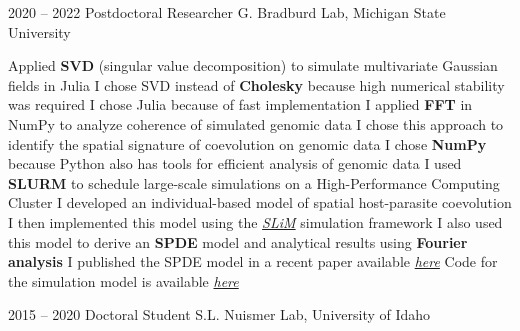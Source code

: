 \documentclass[9pt]{developercv} %
\begin{document}
\begin{entrylist}
{\begin{outline}[itemize]
                \end{outline}}
               \entry
               {2020 -- 2022}
               {Postdoctoral Researcher}
               {G. Bradburd Lab, Michigan State University}
               {\vspace{-10 pt}\begin{outline}[itemize]
                    \1 Applied \textbf{SVD} (singular value decomposition) to simulate multivariate Gaussian fields in Julia
                        \vspace{-6 pt}\2[$\cdot$] I chose SVD instead of \textbf{Cholesky} because high numerical stability was required
                        \vspace{-3 pt}\2[$\cdot$] I chose Julia because of fast implementation
                    \vspace{-6 pt}\1 I applied \textbf{FFT} in NumPy to analyze coherence of simulated genomic data
                        \vspace{-6 pt} \2[$\cdot$] I chose this approach to identify the spatial signature of coevolution on genomic data
                        \vspace{-3 pt} \2[$\cdot$] I chose \textbf{NumPy} because Python also has tools for efficient analysis of genomic data
                    \vspace{-6 pt} \1 I used \textbf{SLURM} to schedule large-scale simulations on a High-Performance Computing Cluster
                    \vspace{-6 pt} \1 I developed an individual-based model of spatial host-parasite coevolution
                        \vspace{-6 pt} \2[$\cdot$] I then implemented this model using the \emph{\href{https://messerlab.org/slim/}{SLiM}} simulation framework 
                        \vspace{-3 pt} \2[$\cdot$] I also used this model to derive an \textbf{SPDE} model and analytical results using \textbf{Fourier analysis}
                    \vspace{-6 pt} \1 I published the SPDE model in a recent paper available \emph{\href{https://doi.org/10.1086/727470}{here}}
                    \vspace{-6 pt} \1 Code for the simulation model is available \emph{\href{https://github.com/bobweek/genomic-sign-coev-cont-sp}{here}}
                \end{outline}}                    
        \entry
        {2015 -- 2020}
        {Doctoral Student}
        {S.L. Nuismer Lab, University of Idaho}

\end{entrylist}
\end{document}

